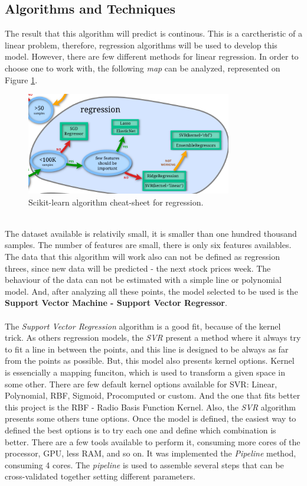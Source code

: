 \subsection{Algorithms and Techniques}
\label{subsec:algorithm}
The result that this algorithm will predict is continous. This is a carctheristic of a linear problem, therefore, regression algorithms will be used to develop this model.
However, there are few different methods for linear regression. In order to choose one to work with, the following \textit{map} can be analyzed, represented on Figure \ref{fig:regression_map}.\\
\begin{figure}[H]
\centering
\includegraphics[width=0.8\textwidth]{figures/regression_map.png}
\caption{\label{fig:data} Scikit-learn algorithm cheat-sheet for regression.}
\label{fig:regression_map}
\end{figure}
\ \\
The dataset available is relativily small, it is smaller than one hundred thousand samples. The number of features are small, there is only six features availables. The data that this 
algorithm will work also can not be defined as regression threes, since new data will be predicted - the next stock prices week.
The behaviour of the data can not be estimated with a simple line or polynomial model. And, after analyzing all these points, the model selected to be used is the \textbf{Support Vector Machine - 
Support Vector Regressor}.\\
\\
The \textit{Support Vector Regression} algorithm is a good fit, because of the kernel trick. As others regression models, the \textit{SVR} present a method where it always try to fit a line
in between the points, and this line is designed to be always as far from the points as possible. But, this model also presents kernel options. Kernel is essencially a mapping funciton, which is
used to transform a given space in some other. There are few default kernel options available for SVR: Linear, Polynomial, RBF, Sigmoid, Procomputed or custom. And the one that fits better
this project is the RBF - Radio Basis Function Kernel. Also, the \textit{SVR} algorithm presents some others tune options. Once the model is defined, the easiest way to defined the best options
is to try each one and define which combination is better. There are a few tools available to perform it, consuming more cores of the processor, GPU, less RAM, and so on. It was implemented
the \textit{Pipeline} method, consuming 4 cores. The \textit{pipeline} is used to assemble several steps that can be cross-validated together setting different parameters.



